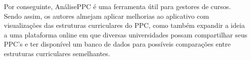 \documentclass[a4paper, 12pt]{article}
\begin{document}
Por conseguinte, AnálisePPC é uma ferramenta útil para gestores de cursos. Sendo assim, os autores almejam aplicar melhorias ao aplicativo com visualizações 
das estruturas curriculares do PPC, como também expandir a ideia a uma plataforma online em que diversas universidades possam compartilhar seus PPC's e 
ter disponível um banco de dados para possíveis comparações entre estruturas curriculares semelhantes.




\end{document}
